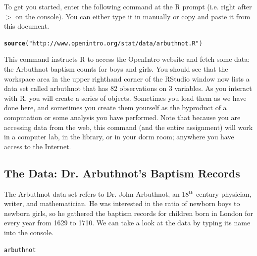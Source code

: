 \documentclass{article}\usepackage[]{graphicx}\usepackage[]{color}
\makeatletter
\newcommand{\hlstr}[1]{\textcolor[rgb]{0.192,0.494,0.8}{#1}}%
\newcommand{\hlstd}[1]{\textcolor[rgb]{0.345,0.345,0.345}{#1}}%
\newcommand{\hlkwd}[1]{\textcolor[rgb]{0.737,0.353,0.396}{\textbf{#1}}}%
\newenvironment{kframe}{%
 \def\at@end@of@kframe{}%
 \ifinner\ifhmode%
  \def\at@end@of@kframe{\end{minipage}}%
  \begin{minipage}{\columnwidth}%
 \fi\fi%
 \def\FrameCommand##1{\hskip\@totalleftmargin \hskip-\fboxsep
 \colorbox{shadecolor}{##1}\hskip-\fboxsep
     \hskip-\linewidth \hskip-\@totalleftmargin \hskip\columnwidth}%
 \MakeFramed {\advance\hsize-\width
   \@totalleftmargin\z@ \linewidth\hsize
   \@setminipage}}%
 {\par\unskip\endMakeFramed%
 \at@end@of@kframe}
\newenvironment{knitrout}{}{} %
\makeatother
\begin{document}
To get you started, enter the following command at the R prompt (i.e. right after $>$ on the console).  You can either type it in manually or copy and paste it from this document.

\begin{knitrout}
\color{fgcolor}\begin{kframe}
\begin{alltt}
\hlkwd{source}\hlstd{(}\hlstr{"http://www.openintro.org/stat/data/arbuthnot.R"}\hlstd{)}
\end{alltt}
\end{kframe}
\end{knitrout}


This command instructs R to access the OpenIntro website and fetch some data: the Arbuthnot baptism counts for boys and girls. You should see that the workspace area in the upper righthand corner of the RStudio window now lists a data set called \hlstd{arbuthnot} that has 82 observations on 3 variables. As you interact with R, you will create a series of objects. Sometimes you load them as we have done here, and sometimes you create them yourself as the byproduct of a computation or some analysis you have performed. Note that because you are accessing data from the web, this command (and the entire assignment) will work in a computer lab, in the library, or in your dorm room; anywhere you have access to the Internet.

\subsection*{The Data: Dr. Arbuthnot's Baptism Records}

The Arbuthnot data set refers to Dr. John Arbuthnot, an 18$^{\textrm{th}}$ century physician, writer, and mathematician.  He was interested in the ratio of newborn boys to newborn girls, so he gathered the baptism records for children born in London for every year from 1629 to 1710.  We can take a look at the data by typing its name into the console.

\begin{knitrout}
\color{fgcolor}\begin{kframe}
\begin{alltt}
\hlstd{arbuthnot}
\end{alltt}
\end{kframe}
\end{knitrout}
\end{document}
